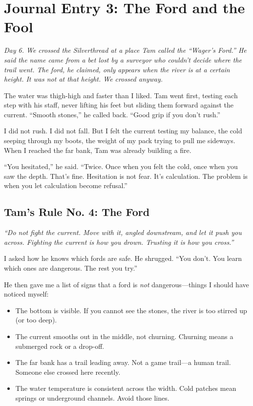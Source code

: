 \documentclass[11pt]{article}
\begin{document}
\section*{Journal Entry 3: The Ford and the Fool}
\textit{Day 6. We crossed the Silverthread at a place Tam called the ``Wager's Ford.'' He said the name came from a bet lost by a surveyor who couldn't decide where the trail went. The ford, he claimed, only appears when the river is at a certain height. It was not at that height. We crossed anyway.}

The water was thigh-high and faster than I liked. Tam went first, testing each step with his staff, never lifting his feet but sliding them forward against the current. ``Smooth stones,'' he called back. ``Good grip if you don't rush.''

I did not rush. I did not fall. But I felt the current testing my balance, the cold seeping through my boots, the weight of my pack trying to pull me sideways. When I reached the far bank, Tam was already building a fire.

``You hesitated,'' he said. ``Twice. Once when you felt the cold, once when you saw the depth. That's fine. Hesitation is not fear. It's calculation. The problem is when you let calculation become refusal.''

\subsection*{Tam's Rule No. 4: The Ford}
\textit{``Do not fight the current. Move with it, angled downstream, and let it push you across. Fighting the current is how you drown. Trusting it is how you cross.''}

I asked how he knows which fords are safe. He shrugged. ``You don't. You learn which ones are dangerous. The rest you try.''

He then gave me a list of signs that a ford is \textit{not} dangerous---things I should have noticed myself:
\begin{itemize}
    \item The bottom is visible. If you cannot see the stones, the river is too stirred up (or too deep).
    \item The current smooths out in the middle, not churning. Churning means a submerged rock or a drop-off.
    \item The far bank has a trail leading away. Not a game trail---a human trail. Someone else crossed here recently.
    \item The water temperature is consistent across the width. Cold patches mean springs or underground channels. Avoid those lines.
\end{itemize}
\end{document}
